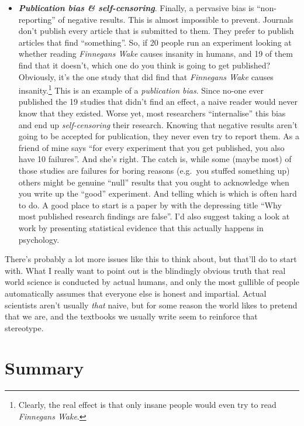 \documentclass[
]{book}
\begin{document}
\begin{itemize}
\item
  \textbf{\emph{Publication bias \& self-censoring}}. Finally, a pervasive bias is ``non-reporting'' of negative results. This is almost impossible to prevent. Journals don't publish every article that is submitted to them. They prefer to publish articles that find ``something''. So, if 20 people run an experiment looking at whether reading \emph{Finnegans Wake} causes insanity in humans, and 19 of them find that it doesn't, which one do you think is going to get published? Obviously, it's the one study that did find that \emph{Finnegans Wake} causes insanity.\footnote{Clearly, the real effect is that only insane people would even try to read \emph{Finnegans Wake}.} This is an example of a \emph{publication bias}. Since no-one ever published the 19 studies that didn't find an effect, a naive reader would never know that they existed. Worse yet, most researchers ``internalise'' this bias and end up \emph{self-censoring} their research. Knowing that negative results aren't going to be accepted for publication, they never even try to report them. As a friend of mine says ``for every experiment that you get published, you also have 10 failures''. And she's right. The catch is, while some (maybe most) of those studies are failures for boring reasons (e.g.~you stuffed something up) others might be genuine ``null'' results that you ought to acknowledge when you write up the ``good'' experiment. And telling which is which is often hard to do. A good place to start is a paper by \citet{Ioannidis2005} with the depressing title ``Why most published research findings are false''. I'd also suggest taking a look at work by \citet{Kuhberger2014} presenting statistical evidence that this actually happens in psychology.
\end{itemize}

There's probably a lot more issues like this to think about, but that'll do to start with. What I really want to point out is the blindingly obvious truth that real world science is conducted by actual humans, and only the most gullible of people automatically assumes that everyone else is honest and impartial. Actual scientists aren't usually \emph{that} naive, but for some reason the world likes to pretend that we are, and the textbooks we usually write seem to reinforce that stereotype.

\hypertarget{summary}{%
\section{Summary}\label{summary}}
\end{document}
